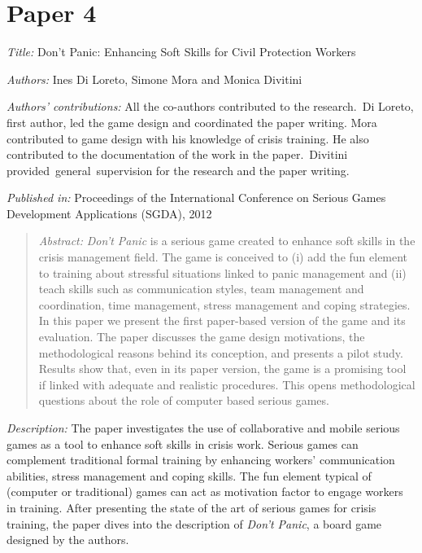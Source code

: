\section[Don't Panic: Enhancing Soft Skills for Civil Protection Workers]{Paper 4}\label{paper-4}

\emph{Title:} Don't Panic: Enhancing Soft Skills for Civil Protection Workers

\emph{Authors:} Ines Di Loreto, Simone Mora and Monica Divitini

\emph{Authors' contributions:} All the co-authors contributed to the research.~Di Loreto, first author, led the game design and coordinated the paper writing. Mora contributed to game design with his knowledge of crisis training. He also contributed to the documentation of the work in the paper.~Divitini provided~general~supervision for the research and the paper writing.

\emph{Published in:} Proceedings of the International Conference on Serious Games Development Applications (SGDA), 2012 
\begin{quote}
	\emph{Abstract:} \emph{Don't Panic} is a serious game created to enhance soft skills in the crisis management field. The game is conceived to (i) add the fun element to training about stressful situations linked to panic management and (ii) teach skills such as communication styles, team management and coordination, time management, stress management and coping strategies. In this paper we present the first paper-based version of the game and its evaluation. The paper discusses the game design motivations, the methodological reasons behind its conception, and presents a pilot study. Results show that, even in its paper version, the game is a promising tool if linked with adequate and realistic procedures. This opens methodological questions about the role of computer based serious games. 
\end{quote}

\emph{Description:} The paper investigates the use of collaborative and mobile serious games as a tool to enhance soft skills in crisis work. Serious games can complement traditional formal training by enhancing workers' communication abilities, stress management and coping skills. The fun element typical of (computer or traditional) games can act as motivation factor to engage workers in training. After presenting the state of the art of serious games for crisis training, the paper dives into the description of \emph{Don't Panic}, a board game designed by the authors. 

